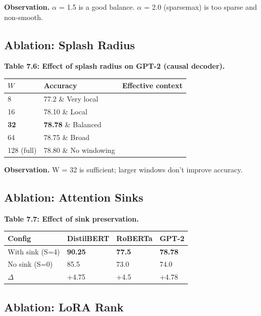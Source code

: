 \textbf{Observation.} $\alpha$ = 1.5 is a good balance. $\alpha$ = 2.0 (sparsemax) is too sparse 
and non-smooth.

\subsection{Ablation: Splash Radius}

\textbf{Table 7.6: Effect of splash radius on GPT-2 (causal decoder).}

\begin{table}[H]
\centering
\small
\begin{tabular}{lll}
\toprule
\textbf{$W$} & \textbf{Accuracy} & \textbf{Effective context} \\
\midrule
8 & 77.2 \& Very local \\
16 & 78.10 \& Local \\
\textbf{32} & \textbf{78.78} \& Balanced \\
64 & 78.75 \& Broad \\
128 (full) & 78.80 \& No windowing \\
\bottomrule
\end{tabular}
\end{table}

\textbf{Observation.} W = 32 is sufficient; larger windows don't improve accuracy.

\subsection{Ablation: Attention Sinks}

\textbf{Table 7.7: Effect of sink preservation.}

\begin{table}[H]
\centering
\small
\begin{tabular}{llll}
\toprule
\textbf{Config} & \textbf{DistilBERT} & \textbf{RoBERTa} & \textbf{GPT-2} \\
\midrule
With sink (S=4) & \textbf{90.25} & \textbf{77.5} & \textbf{78.78} \\
No sink (S=0) & 85.5 & 73.0 & 74.0 \\
$\Delta$ & +4.75 & +4.5 & +4.78 \\
\bottomrule
\end{tabular}
\end{table}

\subsection{Ablation: LoRA Rank}

